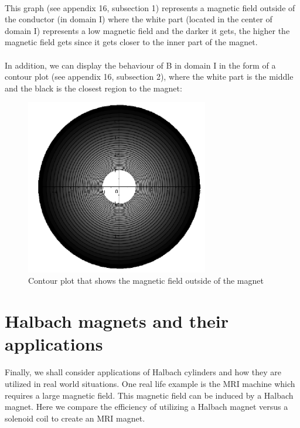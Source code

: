 \documentclass{article}
\begin{document}
\\
This graph (see appendix 16, subsection 1) represents a magnetic field  outside of the conductor (in domain I) where the white part (located in the center of domain I) represents a low magnetic field and the darker it gets, the higher the magnetic field gets since it gets closer to the inner part of the magnet.
\\
\\
In addition, we can display the behaviour of B in domain I in the form of a contour plot (see appendix 16, subsection 2), where the white part is the middle and the black is the closest region to the magnet:
\begin{figure}[h!]
\includegraphics[width=8cm]{exercise31__2.PNG}
\centering
\caption{Contour plot that shows the magnetic field outside of the magnet}
\end{figure}
\section{Halbach magnets and their applications}
Finally, we shall consider applications of Halbach cylinders and how they are utilized in real world situations. One real life example is the MRI machine which requires a large magnetic field. This magnetic field can be induced by a Halbach magnet. Here we compare the efficiency of utilizing a Halbach magnet versus a solenoid coil to create an MRI magnet.  
\end{document}
